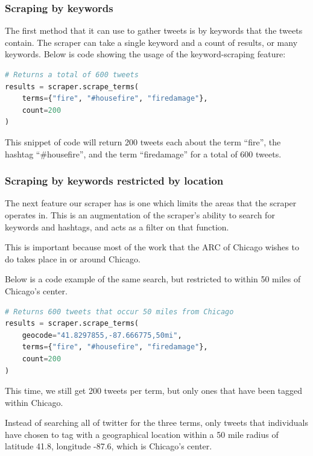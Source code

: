 \documentclass[titlepage, 12pt]{article}
\begin{document}
\subsubsection{Scraping by keywords}

\hspace{0.5 cm}The first method that it can use to gather tweets is by keywords that the tweets contain. The scraper can take a single keyword and a count of results, or many keywords. Below is code showing the usage of the keyword-scraping feature:

\begin{lstlisting}[language=Python,caption=Scraping multiple keywords]
# Returns a total of 600 tweets
results = scraper.scrape_terms(
    terms={"fire", "#housefire", "firedamage"}, 
    count=200
)
\end{lstlisting}

This snippet of code will return 200 tweets each about the term ``fire'', the hashtag ``\#housefire'', and the term ``firedamage'' for a total of 600 tweets.

\subsubsection{Scraping by keywords restricted by location}

\hspace{0.5 cm}The next feature our scraper has is one which limits the areas that the scraper operates in. This is an augmentation of the scraper's ability to search for keywords and hashtags, and acts as a filter on that function.

This is important because most of the work that the ARC of Chicago wishes to do takes place in or around Chicago.

Below is a code example of the same search, but restricted to within 50 miles of Chicago's center.

\begin{lstlisting}[language=Python,caption=Geo-location scraping filter]
# Returns 600 tweets that occur 50 miles from Chicago
results = scraper.scrape_terms(
    geocode="41.8297855,-87.666775,50mi",
    terms={"fire", "#housefire", "firedamage"}, 
    count=200
)
\end{lstlisting}

This time, we still get 200 tweets per term, but only ones that have been tagged within Chicago.

Instead of searching all of twitter for the three terms, only tweets that individuals have chosen to tag with a geographical location within a 50 mile radius of latitude 41.8, longitude -87.6, which is Chicago's center.
\end{document}
